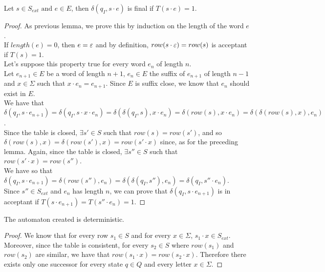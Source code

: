 \begin{lemma}
  \label{lemma:L_acceptance}
  Let $s \in S_{ext} \text{ and } e \in E$, then $\delta(q_I, s \cdot e)$ is final if $T(s \cdot e) = 1$.
\end{lemma}

\begin{proof}
  As previous lemma, we prove this by induction on the length of the word $e$.\\
  If $length(e) = 0$, then $e = \varepsilon$ and by definition, $row(s \cdot \varepsilon) = row(s)$ is acceptant if $T(s) = 1$.\\
  Let's suppose this property true for every word $e_n$ of length $n$.\\
  Let $e_{n+1} \in E$ be a word of length $n + 1$, $e_n \in E$ the suffix of $e_{n+1}$ of length $n - 1$ and $x \in \Sigma$ such that $x \cdot e_n = e_{n+1}$. Since $E$ is suffix close, we know that $e_n$ should exist in $E$.\\
  We have that $\delta(q_I, s \cdot e_{n+1}) = \delta(q_I, s \cdot x \cdot e_n) = \delta(\delta(q_I, s), x \cdot e_n) = \delta(row(s), x \cdot e_n) = \delta(\delta(row(s), x), e_n)$.\\
  Since the table is closed, $\exists s' \in S$ such that $row(s) = row(s')$, and so $\delta(row(s), x) = \delta(row(s'), x) = row(s' \cdot x)$ since, as for the preceding lemma. Again, since the table is closed, $\exists s'' \in S$ such that $row(s' \cdot x) = row(s'')$.\\
  We have so that $\delta(q_I, s \cdot e_{n+1}) = \delta(row(s''), e_n) = \delta(\delta(q_I, s''), e_n) = \delta(q_I, s'' \cdot e_n)$.\\
  Since $s'' \in S_{ext}$ and $e_n$ has length $n$, we can prove that  $\delta(q_I, s \cdot e_{n+1})$ is in acceptant if $T(s \cdot e_{n+1}) = T(s'' \cdot e_n) = 1$.
\end{proof}

\begin{lemma}
  The automaton created is deterministic.
\end{lemma}

\begin{proof}
  We know that for every row $s_1 \in S$ and for every $x \in \Sigma$, $s_1 \cdot x \in S_{ext}$. Moreover, since the table is consistent, for every $s_2 \in S$ where $row(s_1)$ and $row(s_2)$ are similar, we have that $row(s_1 \cdot x) = row(s_2 \cdot x)$. Therefore there exists only one successor for every state $q \in Q$ and every letter $x \in \Sigma$.
\end{proof}

